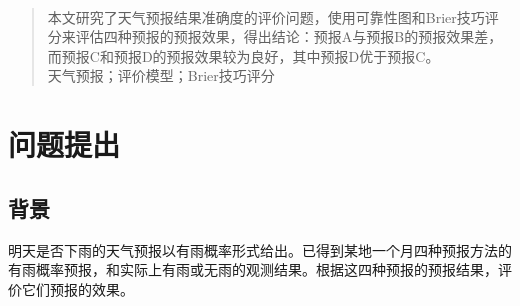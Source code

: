 \documentclass[a4paper,12pt,onecolumn,twoside]{article}
\begin{document}
\begin{center}
	\Large{}\\
\end{center}
\begin{abstract}
	本文研究了天气预报结果准确度的评价问题，使用可靠性图和Brier技巧评分来评估四种预报的预报效果，得出结论：预报A与预报B的预报效果差，而预报C和预报D的预报效果较为良好，其中预报D优于预报C。\\
	天气预报；评价模型；Brier技巧评分
\end{abstract}

\section{问题提出}
\subsection{背景}
明天是否下雨的天气预报以有雨概率形式给出。已得到某地一个月四种预报方法的有雨概率预报，和实际上有雨或无雨的观测结果。根据这四种预报的预报结果，评价它们预报的效果。
\end{document}
